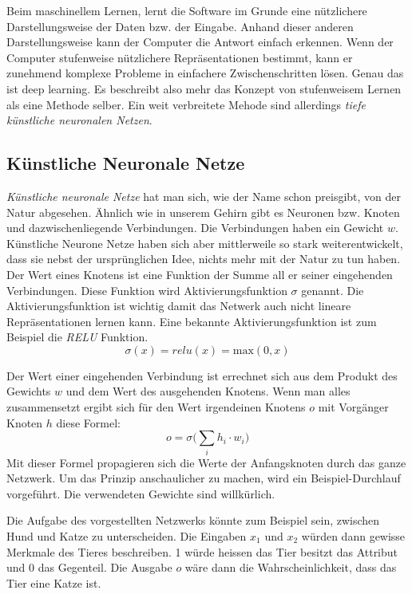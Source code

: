 Beim maschinellem Lernen, lernt die Software im Grunde eine nützlichere Darstellungsweise der Daten bzw. der Eingabe. Anhand dieser anderen Darstellungsweise kann der Computer die Antwort einfach erkennen. Wenn der Computer stufenweise nützlichere Repräsentationen bestimmt, kann er zunehmend komplexe Probleme in einfachere Zwischenschritten lösen. Genau das ist deep learning. Es beschreibt also mehr das Konzept von stufenweisem Lernen als eine Methode selber. Ein weit verbreitete Mehode sind allerdings \textit{tiefe künstliche neuronalen Netzen}.\parencite[vgl.][]{chollet}

\subsection{Künstliche Neuronale Netze}

\textit{Künstliche neuronale Netze} hat man sich, wie der Name schon preisgibt, von der Natur abgesehen. Ähnlich wie in unserem Gehirn gibt es Neuronen bzw. Knoten und dazwischenliegende Verbindungen. Die Verbindungen haben ein Gewicht $w$. Künstliche Neurone Netze haben sich aber mittlerweile so stark weiterentwickelt, dass sie nebst der ursprünglichen Idee, nichts mehr mit der Natur zu tun haben. \\

Der Wert eines Knotens ist eine Funktion der Summe all er seiner eingehenden Verbindungen. Diese Funktion wird Aktivierungsfunktion $\sigma$ genannt. Die Aktivierungsfunktion ist wichtig damit das Netwerk auch nicht lineare Repräsentationen lernen kann. Eine bekannte Aktivierungsfunktion ist zum Beispiel die \textit{RELU} Funktion. \parencite{neuronale_netze} 
$$\sigma(x) = relu(x) = \text{max}(0, x)$$

Der Wert einer eingehenden Verbindung ist errechnet sich aus dem Produkt des Gewichts $w$ und dem Wert des ausgehenden Knotens. Wenn man alles zusammensetzt ergibt sich für den Wert irgendeinen Knotens $o$ mit Vorgänger Knoten $h$ diese Formel:
$$ o = \sigma\Big(\sum_i h_i \cdot w_{i}\Big)$$
Mit dieser Formel propagieren sich die Werte der Anfangsknoten durch das ganze Netzwerk. Um das Prinzip anschaulicher zu machen, wird ein Beispiel-Durchlauf vorgeführt. Die verwendeten Gewichte sind willkürlich.

Die Aufgabe des vorgestellten Netzwerks könnte zum Beispiel sein, zwischen Hund und Katze zu unterscheiden. Die Eingaben $x_1$ und $x_2$ würden dann gewisse Merkmale des Tieres beschreiben. 1 würde heissen das Tier besitzt das Attribut und 0 das Gegenteil. Die Ausgabe $o$ wäre dann die Wahrscheinlichkeit, dass das Tier eine Katze ist.

